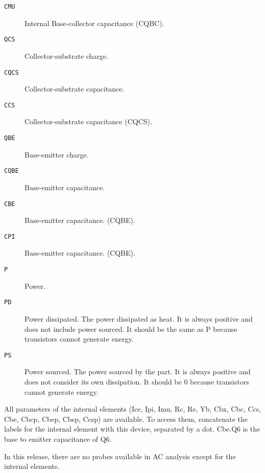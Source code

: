 \begin{description}
\item[{\tt CMU}] Internal Base-collector capacitance (CQBC).

\item[{\tt QCS}] Collector-substrate charge.

\item[{\tt CQCS}] Collector-substrate capacitance.

\item[{\tt CCS}] Collector-substrate capacitance (CQCS).

\item[{\tt QBE}] Base-emitter charge.

\item[{\tt CQBE}] Base-emitter capacitance.

\item[{\tt CBE}] Base-emitter capacitance. (CQBE).

\item[{\tt CPI}] Base-emitter capacitance. (CQBE).

\item[{\tt P}] Power.

\item[{\tt PD}]
Power dissipated.  The power dissipated as heat.  It is always
positive and does not include power sourced.  It should be the same as
P because transistors cannot generate energy.

\item[{\tt PS}]
Power sourced.  The power sourced by the part.  It is always positive
and does not consider its own dissipation.  It should be 0 because
transistors cannot generate energy.

\end{description}

All parameters of the internal elements (Ice, Ipi, Imu, Rc, Re, Yb,
Cbx, Cbc, Ccs, Cbe, Cbcp, Cbep, Cbsp, Ccsp) are available.  To access
them, concatenate the labels for the internal element with this
device, separated by a dot.  Cbe.Q6 is the base to emitter capacitance
of Q6.

In this release, there are no probes available in AC analysis except
for the internal elements.
